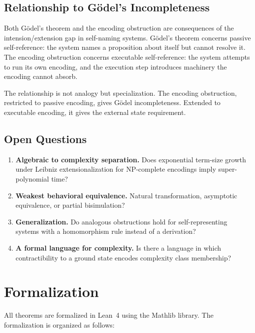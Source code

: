 \documentclass[11pt,a4paper]{article}
\theoremstyle{definition}
\theoremstyle{remark}
\begin{document}
\subsection{Relationship to G\"odel's Incompleteness}

Both G\"odel's theorem and the encoding obstruction are consequences of the
intension/extension gap in self-naming systems. G\"odel's theorem concerns
passive self-reference: the system names a proposition about itself but
cannot resolve it. The encoding obstruction concerns executable
self-reference: the system attempts to run its own encoding, and the
execution step introduces machinery the encoding cannot absorb.

The relationship is not analogy but specialization. The encoding
obstruction, restricted to passive encoding, gives G\"odel incompleteness.
Extended to executable encoding, it gives the external state requirement.

\subsection{Open Questions}

\begin{enumerate}
  \item \textbf{Algebraic to complexity separation.} Does exponential
    term-size growth under Leibniz extensionalization for NP-complete
    encodings imply super-polynomial time?
  \item \textbf{Weakest behavioral equivalence.} Natural transformation,
    asymptotic equivalence, or partial bisimulation?
  \item \textbf{Generalization.} Do analogous obstructions hold for
    self-representing systems with a homomorphism rule instead of a
    derivation?
  \item \textbf{A formal language for complexity.} Is there a language in
    which contractibility to a ground state encodes complexity class
    membership?
\end{enumerate}

\section{Formalization}
\label{sec:formalization}

All theorems are formalized in Lean~4 using the Mathlib library. The
formalization is organized as follows:
\end{document}
